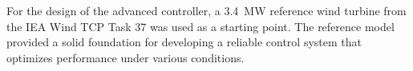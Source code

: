 \\
\\
For the design of the advanced controller, a \SI{3.4}{MW} reference wind turbine from the IEA Wind TCP Task 37 \cite{IEA} was used as a starting point.
The reference model provided a solid foundation for developing a reliable control system that optimizes performance under various conditions.
